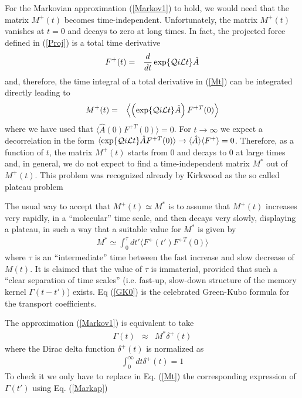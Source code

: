 \documentclass[a4paper,openright,12pt]{book}
\newcommand{\llangle}{\left\langle}
\newcommand{\rrangle}{\right\rangle}
\begin{document}
For the Markovian approximation (\ref{Markov1}) to hold, we would need
that the matrix  $M^+(t)$ becomes time-independent.   Unfortunately,  the  matrix
$M^+(t)$ vanishes at $t=0$ and decays to zero at long times. In
fact,  the projected  force defined  in (\ref{Proj})  is a  total time
derivative
\begin{eqnarray}
  F^+ (t)&=&\frac{d}{dt}\exp\{{\cal Q}i{\cal L}t\} \hat{A}  
\end{eqnarray}
and, therefore, the time integral  of a total derivative in (\ref{Mt})
can be integrated directly leading to
\begin{eqnarray}
M^+(t)&=&
  \llangle\left(\exp\{{\cal Q}i{\cal L}t\}  \hat{A}\right)F^{+T}(0)  \rrangle
\label{m+}
\end{eqnarray}
where we  have used that  $ \langle \hat{A} (0)  F^{+T}(0) \rangle=0$.
For  $t\to\infty$ we  expect a  decorrelation  in the  form $  \langle
\exp\{{\cal   Q}i{\cal  L}t\}   \hat{A}F^{+T}(0)  \rangle\to   \langle
\hat{A}\rangle \langle  F^+\rangle =0$.   Therefore, as a  function of
$t$, the matrix $M^+(t)$ starts from 0  and decays to 0 at large times
and, in  general, we do not  expect to find a  time-independent matrix
$M^*$  out  of  $M^+(t)$.   This problem  was  recognized  already  by
Kirkwood      as      the      so     called      plateau      problem
\cite{Kirkwood1949}

The usual  way to  accept that  $M^+(t)\simeq M^*$  is to  assume that
$M^+(t)$ increases  very rapidly, in  a ``molecular'' time  scale, and
then decays  very slowly, displaying a  plateau, in such a  way that a
suitable value for $M^*$ is given by
\begin{align}
  M^* \simeq \int_0^{\tau} dt'\langle F^+ (t') F^{+T}(0)\rangle 
\label{GK0}
\end{align}
where $\tau$ is an  ``intermediate'' time between  the fast
increase and slow decrease of $M(t)$.  It is claimed that the value of
$\tau$ is immaterial, provided that  such a ``clear separation of time
scales''  (i.e.  fast-up, slow-down  structure  of  the memory  kernel
$\Gamma(t-t')$) exists.  Eq (\ref{GK0})  is the  celebrated Green-Kubo
formula for the transport coefficients.


The   approximation
(\ref{Markov1}) is equivalent to take
\begin{eqnarray}
  \Gamma(t) &\approx& M^*\delta^+(t)
\label{Markap}
\end{eqnarray}
where   the Dirac delta function
$\delta^+(t)$ is normalized as
\begin{align}
  \int_0^\infty dt \delta^+(t) =1
\end{align}
To check it we only have to replace in Eq. (\ref{Mt}) the corresponding expression of $\Gamma(t')$ using Eq. (\ref{Markap})
\end{document}
